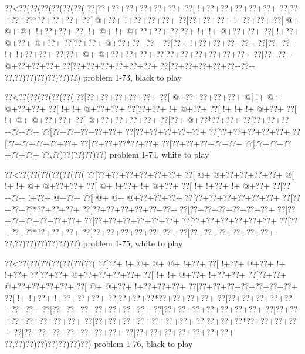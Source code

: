 \vbox{\vbox{\goo
\0??<\0??(\0??(\0??(\0??(\0??(\0??(
\0??[\0??+\0??+\0??+\0??+\0??+\0??+
\0??[\- !+\0??+\0??+\0??+\0??+\0??+
\0??[\0??+\0??+\0??*\0??+\0??+\0??+
\0??[\- @+\0??+\- !+\0??+\0??+\0??+
\0??[\0??+\0??+\0??+\- !+\0??+\0??+
\0??[\- @+\- @+\- @+\- !+\0??+\0??+
\0??[\- !+\- @+\- !+\- @+\0??+\0??+
\0??[\0??+\- !+\- !+\- @+\0??+\0??+
\0??[\- !+\0??+\- @+\0??+\- @+\0??+
\0??[\0??+\0??+\- @+\0??+\0??+\0??+
\0??[\0??+\- !+\0??+\0??+\0??+\0??+
\0??[\0??+\0??+\- !+\- !+\0??+\0??+
\0??[\0??+\- @+\- @+\0??+\0??+\0??+
\0??[\0??+\0??+\0??+\0??+\0??+\0??+
\0??[\0??+\0??+\- @+\0??+\0??+\0??+
\0??[\0??+\0??+\0??+\0??+\0??+\0??+
\0??[\0??+\0??+\0??+\0??+\0??+\0??+
\0??,\0??)\0??)\0??)\0??)\0??)\0??)
}
\hfil problem 1-73, black to play\hfil\break
}

\vbox{\vbox{\goo
\0??<\0??(\0??(\0??(\0??(\0??(
\0??[\0??+\0??+\0??+\0??+\0??+
\0??[\- @+\0??+\0??+\0??+\0??+
\- @[\- !+\- @+\- @+\0??+\0??+
\0??[\- !+\- !+\- @+\0??+\0??+
\0??[\0??+\0??+\- !+\- @+\0??+
\0??[\- !+\- !+\- !+\- @+\0??+
\0??[\- !+\- @+\- @+\0??+\0??+
\0??[\- @+\0??+\0??+\0??+\0??+
\0??[\0??+\- @+\0??*\0??+\0??+
\0??[\0??+\0??+\0??+\0??+\0??+
\0??[\0??+\0??+\0??+\0??+\0??+
\0??[\0??+\0??+\0??+\0??+\0??+
\0??[\0??+\0??+\0??+\0??+\0??+
\0??[\0??+\0??+\0??+\0??+\0??+
\0??[\0??+\0??+\0??*\0??+\0??+
\0??[\0??+\0??+\0??+\0??+\0??+
\0??[\0??+\0??+\0??+\0??+\0??+
\0??,\0??)\0??)\0??)\0??)\0??)
}
\hfil problem 1-74, white to play\hfil\break
}

\vbox{\vbox{\goo
\0??<\0??(\0??(\0??(\0??(\0??(\0??(
\0??[\0??+\0??+\0??+\0??+\0??+\0??+
\0??[\- @+\- @+\0??+\0??+\0??+\0??+
\- @[\- !+\- !+\- @+\- @+\0??+\0??+
\0??[\- @+\- !+\0??+\- !+\- @+\0??+
\0??[\- !+\- !+\0??+\- !+\- @+\0??+
\0??[\0??+\0??+\- !+\0??+\- @+\0??+
\0??[\- @+\- @+\- @+\0??+\0??+\0??+
\0??[\0??+\0??+\0??+\0??+\0??+\0??+
\0??[\0??+\0??+\0??*\0??+\0??+\0??+
\0??[\0??+\0??+\0??+\0??+\0??+\0??+
\0??[\0??+\0??+\0??+\0??+\0??+\0??+
\0??[\0??+\0??+\0??+\0??+\0??+\0??+
\0??[\0??+\0??+\0??+\0??+\0??+\0??+
\0??[\0??+\0??+\0??+\0??+\0??+\0??+
\0??[\0??+\0??+\0??*\0??+\0??+\0??+
\0??[\0??+\0??+\0??+\0??+\0??+\0??+
\0??[\0??+\0??+\0??+\0??+\0??+\0??+
\0??,\0??)\0??)\0??)\0??)\0??)\0??)
}
\hfil problem 1-75, white to play\hfil\break
}

\vbox{\vbox{\goo
\0??<\0??(\0??(\0??(\0??(\0??(\0??(\0??(
\0??[\0??+\- !+\- @+\- @+\- @+\- !+\0??+
\0??[\- !+\0??+\- @+\0??+\- !+\- !+\0??+
\0??[\0??+\0??+\- @+\0??+\0??+\0??+\0??+
\0??[\- !+\- !+\- @+\0??+\- !+\0??+\0??+
\0??[\0??+\0??+\- @+\0??+\0??+\0??+\0??+
\0??[\- @+\- @+\0??+\- !+\0??+\0??+\0??+
\0??[\0??+\0??+\0??+\0??+\0??+\0??+\0??+
\0??[\- !+\- !+\0??+\- !+\0??+\0??+\0??+
\0??[\0??+\0??+\0??*\0??+\0??+\0??+\0??+
\0??[\0??+\0??+\0??+\0??+\0??+\0??+\0??+
\0??[\0??+\0??+\0??+\0??+\0??+\0??+\0??+
\0??[\0??+\0??+\0??+\0??+\0??+\0??+\0??+
\0??[\0??+\0??+\0??+\0??+\0??+\0??+\0??+
\0??[\0??+\0??+\0??+\0??+\0??+\0??+\0??+
\0??[\0??+\0??+\0??*\0??+\0??+\0??+\0??+
\0??[\0??+\0??+\0??+\0??+\0??+\0??+\0??+
\0??[\0??+\0??+\0??+\0??+\0??+\0??+\0??+
\0??,\0??)\0??)\0??)\0??)\0??)\0??)\0??)
}
\hfil problem 1-76, black to play\hfil\break
}

